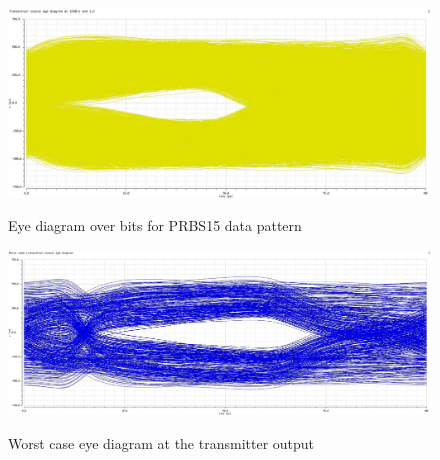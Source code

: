 \begin{figure}[H]
  \centering
  {\includegraphics[scale=0.4]{img/eye_tx_10gbs_5000.jpg}}
  \caption{Eye diagram over \unit[5000]{bits} for PRBS15 data pattern}
  \label{fig:eye_prbs15}
\end{figure}

\begin{figure}[H]
  \centering
  {\includegraphics[scale=0.35]{img/wc_eye_tx.jpg}}
  \caption{Worst case eye diagram at the transmitter output}
  \label{fig:wc_eye}
\end{figure}